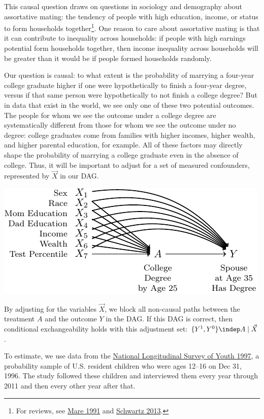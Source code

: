\documentclass[
  letterpaper,
  DIV=11,
  numbers=noendperiod]{scrartcl}
\begin{document}
This causal question draws on questions in sociology and demography
about assortative mating: the tendency of people with high education,
income, or status to form households together\footnote{For reviews, see
  \href{https://doi.org/10.2307/2095670}{Mare 1991} and
  \href{https://doi.org/10.1146/annurev-soc-071312-145544}{Schwartz
  2013}.}. One reason to care about assortative mating is that it can
contribute to inequality across households: if people with high earnings
potential form households together, then income inequality across
households will be greater than it would be if people formed households
randomly.

Our question is causal: to what extent is the probability of marrying a
four-year college graduate higher if one were hypothetically to finish a
four-year degree, versus if that same person were hypothetically to not
finish a college degree? But in data that exist in the world, we see
only one of these two potential outcomes. The people for whom we see the
outcome under a college degree are systematically different from those
for whom we see the outcome under no degree: college graduates come from
families with higher incomes, higher wealth, and higher parental
education, for example. All of these factors may directly shape the
probability of marrying a college graduate even in the absence of
college. Thus, it will be important to adjust for a set of measured
confounders, represented by \(\vec{X}\) in our DAG.

\includegraphics{models_for_causal_files/figure-pdf/unnamed-chunk-2-1.pdf}

By adjusting for the variables \(\vec{X}\), we block all non-causal
paths between the treatment \(A\) and the outcome \(Y\) in the DAG. If
this DAG is correct, then conditional exchangeability holds with this
adjustment set: \(\{Y^1,Y^0\}\indep A \mid\vec{X}\).

To estimate, we use data from the
\href{https://www.bls.gov/nls/nlsy97.htm}{National Longitudinal Survey
of Youth 1997}, a probability sample of U.S. resident children who were
ages 12--16 on Dec 31, 1996. The study followed these children and
interviewed them every year through 2011 and then every other year after
that.
\end{document}
